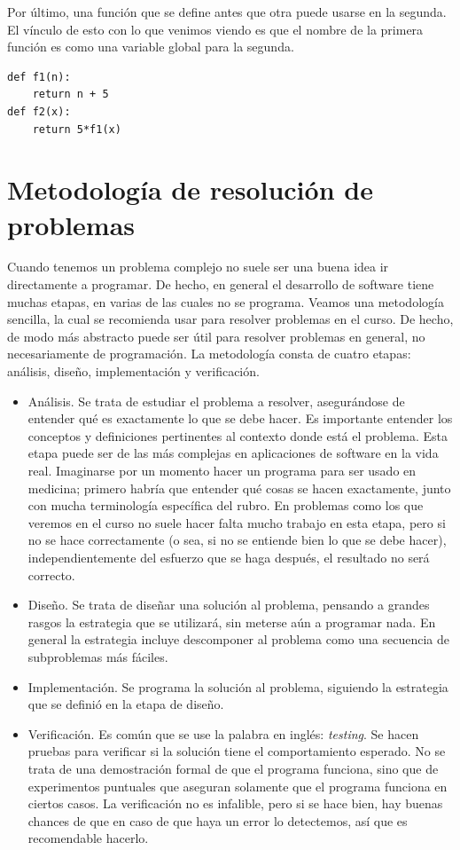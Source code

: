 \documentclass[a4paper, 12pt]{report}
\theoremstyle{definition}
\begin{document}
Por último, una función que se define antes que otra puede usarse en la segunda. El vínculo de esto con lo que venimos viendo es que el nombre de la primera función es como una variable global para la segunda.
\begin{verbatim}
def f1(n):
    return n + 5
def f2(x):
    return 5*f1(x)
\end{verbatim}

\section{Metodología de resolución de problemas}

Cuando tenemos un problema complejo no suele ser una buena idea ir directamente a programar. De hecho, en general el desarrollo de software tiene muchas etapas, en varias de las cuales no se programa. Veamos una metodología sencilla, la cual se recomienda usar para resolver problemas en el curso. De hecho, de modo más abstracto puede ser útil para resolver problemas en general, no necesariamente de programación. La metodología consta de cuatro etapas: análisis, diseño, implementación y verificación.
\begin{itemize}
	\item Análisis. Se trata de estudiar el problema a resolver, asegurándose de entender qué es exactamente lo que se debe hacer. Es importante entender los conceptos y definiciones pertinentes al contexto donde está el problema. Esta etapa puede ser de las más complejas en aplicaciones de software en la vida real. Imaginarse por un momento hacer un programa para ser usado en medicina; primero habría que entender qué cosas se hacen exactamente, junto con mucha terminología específica del rubro. En problemas como los que veremos en el curso no suele hacer falta mucho trabajo en esta etapa, pero si no se hace correctamente (o sea, si no se entiende bien lo que se debe hacer), independientemente del esfuerzo que se haga después, el resultado no será correcto.
	
	\item Diseño. Se trata de diseñar una solución al problema, pensando a grandes rasgos la estrategia que se utilizará, sin meterse aún a programar nada. En general la estrategia incluye descomponer al problema como una secuencia de subproblemas más fáciles.
	
	\item Implementación. Se programa la solución al problema, siguiendo la estrategia que se definió en la etapa de diseño.
	
	\item Verificación. Es común que se use la palabra en inglés: {\sl testing}. Se hacen pruebas para verificar si la solución tiene el comportamiento esperado. No se trata de una demostración formal de que el programa funciona, sino que de experimentos puntuales que aseguran solamente que el programa funciona en ciertos casos. La verificación no es infalible, pero si se hace bien, hay buenas chances de que en caso de que haya un error lo detectemos, así que es recomendable hacerlo.
\end{itemize}
\end{document}
